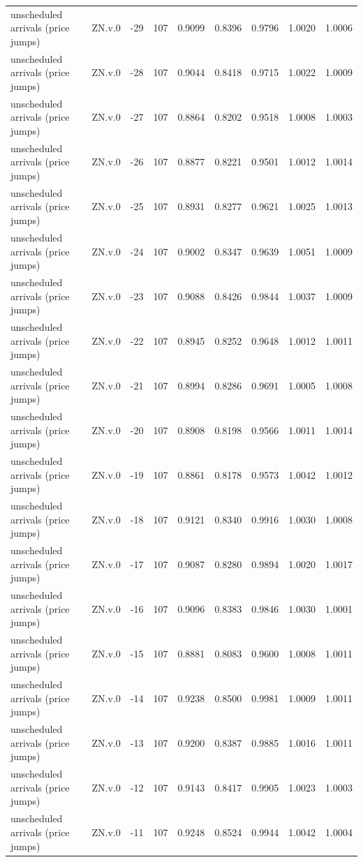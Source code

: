 \begin{tabular}{llrrrrrrr}
unscheduled arrivals (price jumps) & ZN.v.0 & -29 & 107 & 0.9099 & 0.8396 & 0.9796 & 1.0020 & 1.0006 \\
unscheduled arrivals (price jumps) & ZN.v.0 & -28 & 107 & 0.9044 & 0.8418 & 0.9715 & 1.0022 & 1.0009 \\
unscheduled arrivals (price jumps) & ZN.v.0 & -27 & 107 & 0.8864 & 0.8202 & 0.9518 & 1.0008 & 1.0003 \\
unscheduled arrivals (price jumps) & ZN.v.0 & -26 & 107 & 0.8877 & 0.8221 & 0.9501 & 1.0012 & 1.0014 \\
unscheduled arrivals (price jumps) & ZN.v.0 & -25 & 107 & 0.8931 & 0.8277 & 0.9621 & 1.0025 & 1.0013 \\
unscheduled arrivals (price jumps) & ZN.v.0 & -24 & 107 & 0.9002 & 0.8347 & 0.9639 & 1.0051 & 1.0009 \\
unscheduled arrivals (price jumps) & ZN.v.0 & -23 & 107 & 0.9088 & 0.8426 & 0.9844 & 1.0037 & 1.0009 \\
unscheduled arrivals (price jumps) & ZN.v.0 & -22 & 107 & 0.8945 & 0.8252 & 0.9648 & 1.0012 & 1.0011 \\
unscheduled arrivals (price jumps) & ZN.v.0 & -21 & 107 & 0.8994 & 0.8286 & 0.9691 & 1.0005 & 1.0008 \\
unscheduled arrivals (price jumps) & ZN.v.0 & -20 & 107 & 0.8908 & 0.8198 & 0.9566 & 1.0011 & 1.0014 \\
unscheduled arrivals (price jumps) & ZN.v.0 & -19 & 107 & 0.8861 & 0.8178 & 0.9573 & 1.0042 & 1.0012 \\
unscheduled arrivals (price jumps) & ZN.v.0 & -18 & 107 & 0.9121 & 0.8340 & 0.9916 & 1.0030 & 1.0008 \\
unscheduled arrivals (price jumps) & ZN.v.0 & -17 & 107 & 0.9087 & 0.8280 & 0.9894 & 1.0020 & 1.0017 \\
unscheduled arrivals (price jumps) & ZN.v.0 & -16 & 107 & 0.9096 & 0.8383 & 0.9846 & 1.0030 & 1.0001 \\
unscheduled arrivals (price jumps) & ZN.v.0 & -15 & 107 & 0.8881 & 0.8083 & 0.9600 & 1.0008 & 1.0011 \\
unscheduled arrivals (price jumps) & ZN.v.0 & -14 & 107 & 0.9238 & 0.8500 & 0.9981 & 1.0009 & 1.0011 \\
unscheduled arrivals (price jumps) & ZN.v.0 & -13 & 107 & 0.9200 & 0.8387 & 0.9885 & 1.0016 & 1.0011 \\
unscheduled arrivals (price jumps) & ZN.v.0 & -12 & 107 & 0.9143 & 0.8417 & 0.9905 & 1.0023 & 1.0003 \\
unscheduled arrivals (price jumps) & ZN.v.0 & -11 & 107 & 0.9248 & 0.8524 & 0.9944 & 1.0042 & 1.0004 \\

\end{tabular}
